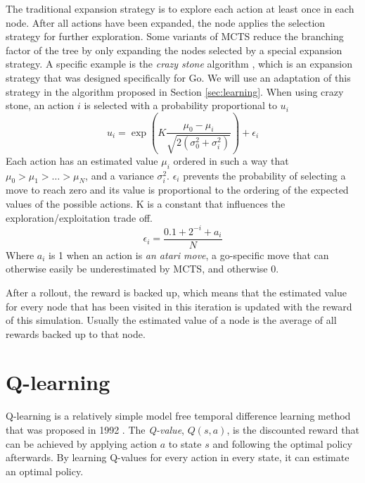 The traditional expansion strategy is to explore each action at least once in
each node. After all actions have been expanded, the node applies the selection
strategy for further exploration. Some variants of MCTS reduce the branching
factor of the tree by only expanding the nodes selected by a special expansion
strategy. A specific example is the \emph{crazy stone} algorithm
\cite{coulom2007efficient}, which is an expansion strategy that was designed
specifically for Go. We will use an adaptation of this strategy in the algorithm
proposed in Section \ref{sec:learning}.  When using crazy stone, an action $i$
is selected with a probability proportional to $u_i$
\begin{equation}
	\label{eq:crazystone}
	u_i = \exp\left(K \frac{\mu_0 - \mu_i}{\sqrt{2\left(\sigma_0^2 +
\sigma_i^2\right)}}\right) + \epsilon_i
\end{equation}
Each action has an estimated value $\mu_i$ ordered in such a way that $\mu_0 >
\mu_1 > \ldots > \mu_N$, and a variance $\sigma_i^2$. $\epsilon_i$ prevents 
the probability of selecting a move to reach zero and its value is proportional to
the ordering of the expected values of the possible actions. K is a constant
that influences the exploration/exploitation trade off.
\begin{equation}
	\label{eq:epsilon}
	\epsilon_i = \frac{0.1 + 2^{-i} + a_i}{N}
\end{equation}
Where $a_i$ is 1 when an action is \emph{an atari move}, a go-specific
move that can otherwise easily be underestimated by MCTS, and otherwise 0.

After a rollout, the reward is backed up, which means that the estimated value
for every node that has been visited in this iteration is updated with the
reward of this simulation. Usually the estimated value of a node is the average
of all rewards backed up to that node.

\section{Q-learning}
\label{subsec:qlearning}
Q-learning is a relatively simple model free temporal difference learning method
that was proposed in 1992 \cite{watkins1992q}. The \emph{Q-value}, $Q(s, a)$, is
the discounted reward that can be achieved by applying action $a$ to state $s$
and following the optimal policy afterwards. By learning Q-values for every
action in every state, it can estimate an optimal policy. 

